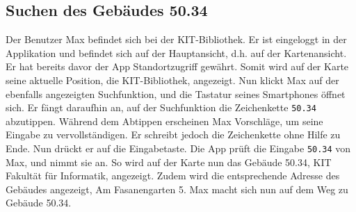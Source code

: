 \subsection{Suchen des Gebäudes 50.34}

Der Benutzer Max befindet sich bei der KIT-Bibliothek. 
Er ist eingeloggt in der Applikation und befindet sich auf der Hauptansicht, d.h. auf der Kartenansicht. 
Er hat bereits davor der App Standortzugriff gewährt. 
Somit wird auf der Karte seine aktuelle Position, die KIT-Bibliothek, angezeigt.
Nun klickt Max auf der ebenfalls angezeigten Suchfunktion, und die Tastatur seines Smartphones öffnet sich.
Er fängt daraufhin an, auf der Suchfunktion die Zeichenkette \texttt{50.34} abzutippen. 
Während dem Abtippen erscheinen Max Vorschläge, um seine Eingabe zu vervollständigen. 
Er schreibt jedoch die Zeichenkette ohne Hilfe zu Ende. 
Nun drückt er auf die Eingabetaste. 
Die App prüft die Eingabe \texttt{50.34} von Max, und nimmt sie an. 
So wird auf der Karte nun das Gebäude 50.34, KIT Fakultät für Informatik, angezeigt. 
Zudem wird die entsprechende Adresse des Gebäudes angezeigt, Am Fasanengarten 5. 
Max macht sich nun auf dem Weg zu Gebäude 50.34.
